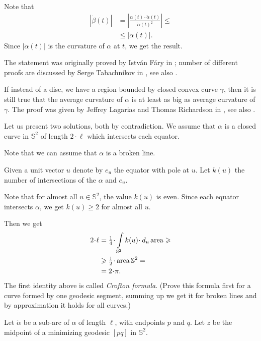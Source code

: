 Note that 
\begin{align*}
|\dot\beta(t)|&=|\tfrac{\alpha(t)\cdot\ddot\alpha(t)}{\dot\alpha(t)^2}|\le
\\
&\le|\ddot\alpha(t)|.
\end{align*}
Since $|\ddot\alpha(t)|$ is the curvature of $\alpha$ at $t$,
we get the result.\qeds

The statement was originally proved 
by Istv\'an F\'ary in \cite{fary};
number of different proofs are discussed by Serge Tabachnikov in \cite{tabachnikov}, see also \cite[19.5 in ][]{fuchs-tabachnikov}.

If instead of a disc, 
we have a region bounded by closed convex curve $\gamma$, 
then it is still true that the average curvature of $\alpha$ is at least as big as average curvature of $\gamma$. 
The proof was given by Jeffrey Lagarias
and Thomas Richardson in \cite{lagarias-richardson}, see also \cite{nazarov-petrov}.


Let us present two solutions, both by contradiction.
We assume that $\alpha$ is a closed curve in $\mathbb{S}^2$ of length $2\cdot\ell$ which intersects each equator.

Note that we can assume that $\alpha$ is a broken line.

Given a unit vector $u$ denote by $e_u$ the equator with pole at $u$.
Let $k(u)$ the number of intersections
of the $\alpha$ and $e_u$.

Note that for almost all $u\in \mathbb{S}^2$, the value $k(u)$ is even.
Since each equator intersects $\alpha$, we get $k(u)\ge 2$ for almost all $u$.

Then we get
\begin{align*}
2\cdot\ell&=\tfrac14\cdot\int\limits_{\mathbb{S}^2}k(u)\cdot\, d_u\area\ge 
\\
&\ge\tfrac12\cdot\area\mathbb{S}^2=
\\
&=2\cdot\pi.
\end{align*}
The first identity above is called \emph{Crofton formula}.
(Prove this formula first for a curve formed by one geodesic segment,
summing up we get it for broken lines
and by approximation it holds for all curves.)
\qeds

Let $\check\alpha$ be a sub-arc of $\alpha$ of length $\ell$, with endpoints $p$ and $q$.  
Let $z$ be the midpoint of a minimizing geodesic $[pq]$ in $\mathbb{S}^2$.  

